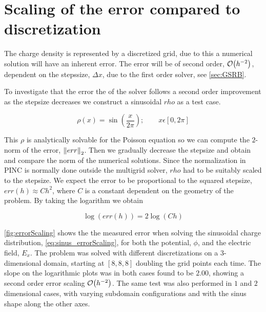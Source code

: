 \section{Scaling of the error compared to discretization}
The charge density is represented by a discretized grid, due to this a numerical solution
will have an inherent error.
The error will be of second order, \(\order{h^{-2}}\), dependent on the
stepssize, \(\Delta x\), due to the first order solver, see \cref{sec:GSRB}.

To investigate that the error the of the solver follows a second order improvement
as the stepsize decreases we construct a sinusoidal \(rho\) as a test case.

\begin{equation}
    \rho(x) = \sin{\left(\frac{x}{2\pi}\right)}; \qquad x\epsilon[0,2\pi] \label{eq:sinus_errorScaling}
\end{equation}

This \(\rho\) is analytically solvable for the Poisson equation so we can compute the
\(2\)-norm of the error, \(\norm{err}_2\). Then we gradually decrease the stepsize
and obtain and compare the norm of the numerical solutions. Since the normalization in PINC
is normally done outside the multigrid solver, \(rho\) had to be suitably scaled
to the stepsize. We expect the error to be proportional to the squared stepsize, \(err(h) \approx Ch^2\), where \(C\) is a constant dependent on the geometry of the problem.
By taking the logarithm we obtain

\begin{equation}
    \log(err(h)) = 2\log(Ch)
\end{equation}

\cref{fig:errorScaling} shows the
the measured error when solving the sinusoidal charge distribution, \cref{eq:sinus_errorScaling},
for both the potential, \(\phi\), and the electric field, \(E_x\).
The problem was solved with different discretizations on a \(3\)-dimensional domain,
starting at \([8,8,8]\) doubling the grid points each time. The slope on the logarithmic plots
was in both cases found to be \(2.00\), showing a second order error scaling \(\order{h^{-2}}\).
The same test was also performed in \(1\) and \(2\) dimensional cases, with varying
subdomain configurations and with the sinus shape along the other axes.

